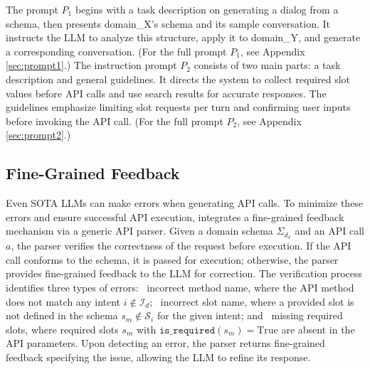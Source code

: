 \vspace{5pt}
The prompt \(P_1\) begins with a task description on generating a dialog from a schema, then presents {domain\_X}'s schema and its sample conversation. It instructs the LLM to analyze this structure, apply it to {domain\_Y}, and generate a corresponding conversation. (For the full prompt \(P_1\), see Appendix \ref{sec:prompt1}.) The instruction prompt \(P_2\) consists of two main parts: a task description and general guidelines. It directs the system to collect required slot values before API calls and use search results for accurate responses. The guidelines emphasize limiting slot requests per turn and confirming user inputs before invoking the API call. (For the full prompt \(P_2\), see Appendix \ref{sec:prompt2}.)

\subsection{Fine-Grained Feedback}

Even SOTA LLMs can make errors when generating API calls. 
To minimize these errors and ensure successful API execution, {\ours} integrates a fine-grained feedback mechanism via a generic API parser. Given a domain schema \( \Sigma_{d_x} \) and an API call \(a\), the parser verifies the correctness of the request before execution. 
If the API call conforms to the schema, it is passed for execution; otherwise, the parser provides fine-grained feedback to the LLM for correction.  
The verification process identifies three types of errors: ~incorrect method name, where the API method does not match any intent \( i \not\in \mathcal{I}_d \); ~incorrect slot name, where a provided slot is not defined in the schema \( s_m \not\in \mathcal{S}_i \) for the given intent; and ~missing required slots, where required slots \( s_m \) with \( \texttt{is\_required}(s_m) = \text{True} \) are absent in the API parameters. 
Upon detecting an error, the parser returns fine-grained feedback specifying the issue, allowing the LLM to refine its response. 



